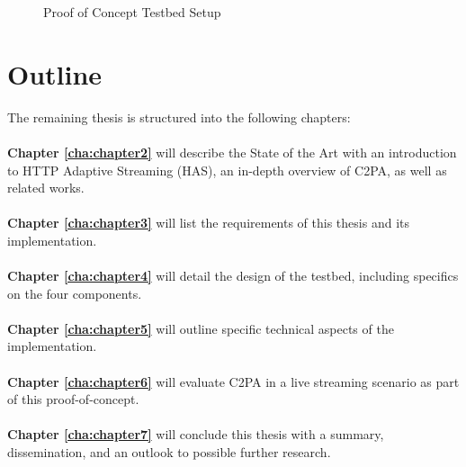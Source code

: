\begin{figure}[H]
    \centering
    \caption{Proof of Concept Testbed Setup}
    \label{fig:testbed}
\end{figure}

\section{Outline\label{sec:outline}}

The remaining thesis is structured into the following chapters:
\\
\\
\textbf{Chapter \ref{cha:chapter2}} will describe the State of the Art with an introduction to HTTP Adaptive Streaming (HAS), an in-depth overview of C2PA, as well as related works.
\\
\\
\textbf{Chapter \ref{cha:chapter3}} will list the requirements of this thesis and its implementation.
\\
\\
\textbf{Chapter \ref{cha:chapter4}} will detail the design of the testbed, including specifics on the four components.
\\
\\
\textbf{Chapter \ref{cha:chapter5}} will outline specific technical aspects of the implementation.
\\
\\
\textbf{Chapter \ref{cha:chapter6}} will evaluate C2PA in a live streaming scenario as part of this proof-of-concept.
\\
\\
\textbf{Chapter \ref{cha:chapter7}} will conclude this thesis with a summary, dissemination, and an outlook to possible further research.
